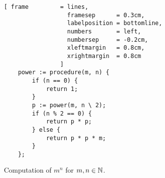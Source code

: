 \begin{figure}[!h]
  \centering
\begin{Verbatim}[ frame         = lines, 
                  framesep      = 0.3cm, 
                  labelposition = bottomline,
                  numbers       = left,
                  numbersep     = -0.2cm,
                  xleftmargin   = 0.8cm,
                  xrightmargin  = 0.8cm
                ]
    power := procedure(m, n) {
        if (n == 0) {
            return 1;
        }
        p := power(m, n \ 2);
        if (n % 2 == 0) {
            return p * p;
        } else {
            return p * p * m;
        }
    };
\end{Verbatim}
\vspace*{-0.3cm}
  \caption{Computation of $m^n$ for $m,n \in {\mathbb N}$.}
  \label{fig:power.stlx}
\end{figure} 


